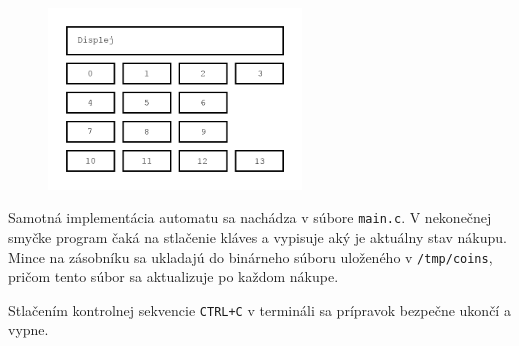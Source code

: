 \documentclass[pdftex,12pt,a4paper]{article}
\begin{document}
\begin{itemize}
\begin{figure}[htb]
	\begin{center}
		\leavevmode
		\includegraphics[width=0.6\textwidth]{klavesy.png}
	\end{center}
\end{figure}

\end{itemize}

Samotná implementácia automatu sa nachádza v súbore \texttt{main.c}. V nekonečnej smyčke program čaká na stlačenie kláves a vypisuje aký je aktuálny stav nákupu. Mince na zásobníku sa ukladajú do binárneho súboru uloženého v \texttt{/tmp/coins}, pričom tento súbor sa aktualizuje po každom nákupe.

Stlačením kontrolnej sekvencie \texttt{CTRL+C} v termináli sa prípravok bezpečne ukončí a vypne.
\end{document}

